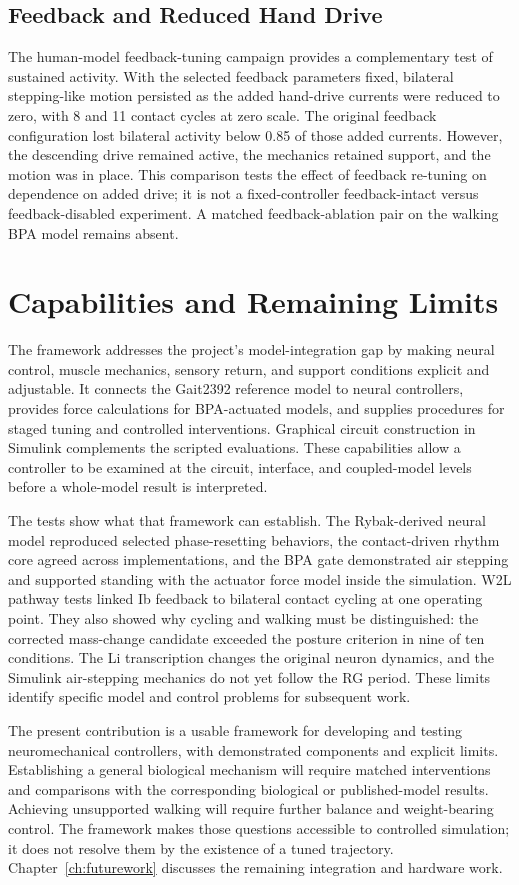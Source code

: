 \subsection{Feedback and Reduced Hand Drive}

The human-model feedback-tuning campaign provides a complementary test of sustained activity. With the selected feedback parameters fixed, bilateral stepping-like motion persisted as the added hand-drive currents were reduced to zero, with 8 and 11 contact cycles at zero scale. The original feedback configuration lost bilateral activity below 0.85 of those added currents. However, the descending drive remained active, the mechanics retained support, and the motion was in place. This comparison tests the effect of feedback re-tuning on dependence on added drive; it is not a fixed-controller feedback-intact versus feedback-disabled experiment. A matched feedback-ablation pair on the walking BPA model remains absent.

\section{Capabilities and Remaining Limits}\label{sec:sns_discussion}

The framework addresses the project's model-integration gap by making neural control, muscle mechanics, sensory return, and support conditions explicit and adjustable. It connects the Gait2392 reference model to neural controllers, provides force calculations for BPA-actuated models, and supplies procedures for staged tuning and controlled interventions. Graphical circuit construction in Simulink complements the scripted evaluations. These capabilities allow a controller to be examined at the circuit, interface, and coupled-model levels before a whole-model result is interpreted.

The tests show what that framework can establish. The Rybak-derived neural model reproduced selected phase-resetting behaviors, the contact-driven rhythm core agreed across implementations, and the BPA gate demonstrated air stepping and supported standing with the actuator force model inside the simulation. W2L pathway tests linked Ib feedback to bilateral contact cycling at one operating point. They also showed why cycling and walking must be distinguished: the corrected mass-change candidate exceeded the posture criterion in nine of ten conditions. The Li transcription changes the original neuron dynamics, and the Simulink air-stepping mechanics do not yet follow the RG period. These limits identify specific model and control problems for subsequent work.

The present contribution is a usable framework for developing and testing neuromechanical controllers, with demonstrated components and explicit limits. Establishing a general biological mechanism will require matched interventions and comparisons with the corresponding biological or published-model results. Achieving unsupported walking will require further balance and weight-bearing control. The framework makes those questions accessible to controlled simulation; it does not resolve them by the existence of a tuned trajectory. Chapter~\ref{ch:futurework} discusses the remaining integration and hardware work.
